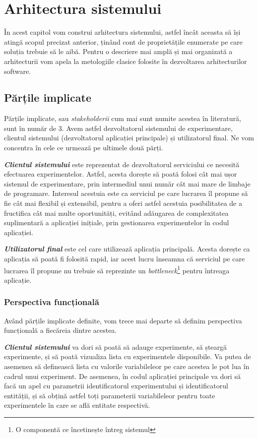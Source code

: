 \chapter{Arhitectura sistemului}

În acest capitol vom construi arhitectura sistemului, astfel încât aceasta să își atingă scopul precizat anterior, ținând cont de proprietățile enumerate pe care soluția trebuie să le aibă. Pentru o descriere mai amplă și mai organizată a arhitecturii vom apela la metologiile clasice folosite în dezvoltarea arhitecturilor software.

\section{Părțile implicate}

Părțile implicate, sau \textit{stakeholderii} cum mai sunt numite acestea în literatură, sunt în număr de 3. Avem astfel dezvoltatorul sistemului de experimentare, clientul sistemului (dezvoltatorul aplicației principale) și utilizatorul final. Ne vom concentra în cele ce urmează pe ultimele două părți.

\textbf{\textit{Clientul sistemului}} este reprezentat de dezvoltatorul serviciului ce necesită efectuarea experimentelor. Astfel, acesta dorește să poată folosi cât mai ușor sistemul de experimentare, prin intermediul unui număr cât mai mare de limbaje de programare. Interesul acestuia este ca serviciul pe care lucrarea îl propune să fie cât mai flexibil și extensibil, pentru a oferi astfel acestuia posibilitatea de a fructifica cât mai multe oportunități, evitând adăugarea de complexitatea suplimentară a aplicației inițiale, prin gestionarea experimentelor în codul aplicației.

\textbf{\textit{Utilizatorul final}} este cel care utilizează aplicația principală. Acesta dorește ca aplicația să poată fi folosită rapid, iar acest lucru înseamna că serviciul pe care lucrarea îl propune nu trebuie să reprezinte un \textit{bottleneck}\footnote{O componentă ce încetinește întreg sistemul} pentru întreaga aplicație.

\subsection{Perspectiva funcțională}

Având părțile implicate definite, vom trece mai departe să definim perspectiva funcțională a fiecăreia dintre acestea.

\textbf{\textit{Clientul sistemului}} va dori să poată să adauge experimente, să șteargă experimente, și să poată vizualiza lista cu experimentele disponibile. Va putea de asemenea să definească lista cu valorile variabileleor pe care acestea le pot lua în cadrul unui experiment. De asemenea, în codul aplicației principale va dori să facă un apel cu parametrii identificatorul experimentului și identificatorul entității, și să obțină astfel toți parameterii variabileleor pentru toate experimentele în care se află entitate respectivă.

